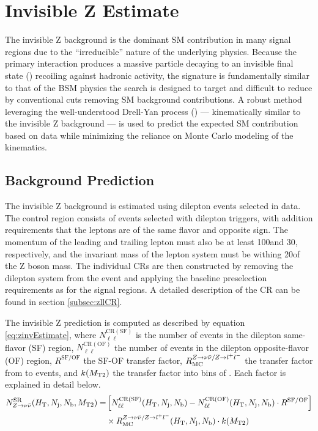\section{Invisible Z Estimate}
\label{sec:zinv}

The invisible Z background is the dominant SM contribution in many signal regions due to the ``irreducible'' nature of the underlying physics. Because the primary interaction produces a massive particle decaying to an invisible final state (\znunu) recoiling against hadronic activity, the signature is fundamentally similar to that of the BSM physics the search is designed to target and difficult to reduce by conventional cuts removing SM background contributions. A robust method leveraging the well-understood Drell-Yan process (\zll) --- kinematically similar to the invisible Z background --- is used to predict the expected SM contribution based on data while minimizing the reliance on Monte Carlo modeling of the kinematics.

\subsection{Background Prediction}
\label{subsec:zinvPrediction}
The invisible Z background is estimated using dilepton events selected in data. The control region consists of events selected with dilepton triggers, with addition requirements that the leptons are of the same flavor and opposite sign. The momentum of the leading and trailing lepton must also be at least 100\GeV and 30\GeV, respectively, and the invariant mass of the lepton system \mll must be withing 20\GeV of the Z boson mass. The individual CRs are then constructed by removing the dilepton system from the event and applying the baseline preselection requirements as for the signal regions. A detailed description of the CR can be found in section \ref{subsec:zllCR}.

The invisible Z prediction is computed as described by equation \ref{eq:zinvEstimate}, where $N_{\ell\ell}^{\mathrm{CR(SF)}}$ is the number of events in the dilepton same-flavor (SF) region, $N_{\ell\ell}^{\mathrm{CR(OF)}}$ the number of events in the dilepton opposite-flavor (OF) region, $R^{\mathrm{SF/OF}}$ the SF-OF transfer factor, $R_{\mathrm{MC}}^{Z\rightarrow\nu\bar{\nu} / Z\rightarrow l^+ l^-}$ the transfer factor from \zll to \znunu events, and $k(M_{\mathrm{T2}})$ the transfer factor into bins of \mttwo. Each factor is explained in detail below. 
\begin{align}
		N_{Z\rightarrow\nu\bar{\nu}}^{\mathrm{SR}}(H_{\mathrm{T}},N_\mathrm{j},N_\mathrm{b},M_{\mathrm{T2}}) =& \left[ N_{\ell\ell}^{\mathrm{CR(SF)}}(H_{\mathrm{T}},N_\mathrm{j},N_\mathrm{b}) - N_{\ell\ell}^{\mathrm{CR(OF)}}(H_{\mathrm{T}},N_\mathrm{j},N_\mathrm{b}) \cdot R^{\mathrm{SF/OF}} \right] \nonumber \\
		& \times R_{\mathrm{MC}}^{Z\rightarrow\nu\bar{\nu} / Z\rightarrow l^+ l^-}(H_{\mathrm{T}},N_\mathrm{j},N_\mathrm{b}) \cdot k(M_{\mathrm{T2}})
	\label{eq:zinvEstimate}
\end{align}

